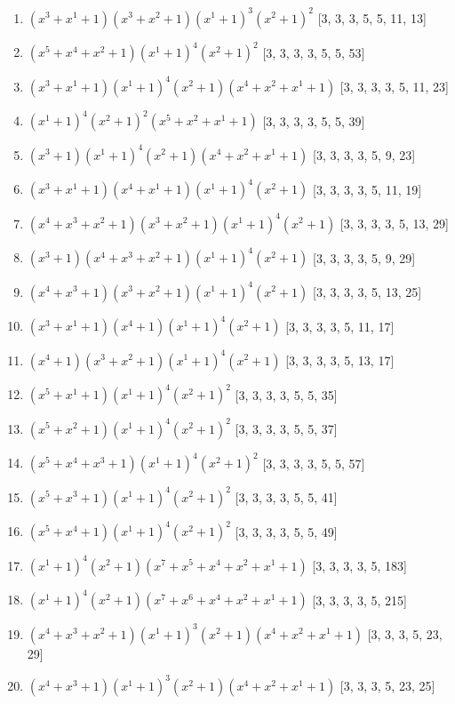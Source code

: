 \documentclass[10pt,twocolumn]{article}
\begin{document}
\begin{enumerate}
\item $(x^{3} + x^{1} + 1)(x^{3} + x^{2} + 1)(x^{1} + 1)^{3}(x^{2} + 1)^{2}$  [3, 3, 3, 5, 5, 11, 13]
\item $(x^{5} + x^{4} + x^{2} + 1)(x^{1} + 1)^{4}(x^{2} + 1)^{2}$  [3, 3, 3, 3, 5, 5, 53]
\item $(x^{3} + x^{1} + 1)(x^{1} + 1)^{4}(x^{2} + 1)(x^{4} + x^{2} + x^{1} + 1)$  [3, 3, 3, 3, 5, 11, 23]
\item $(x^{1} + 1)^{4}(x^{2} + 1)^{2}(x^{5} + x^{2} + x^{1} + 1)$  [3, 3, 3, 3, 5, 5, 39]
\item $(x^{3} + 1)(x^{1} + 1)^{4}(x^{2} + 1)(x^{4} + x^{2} + x^{1} + 1)$  [3, 3, 3, 3, 5, 9, 23]
\item $(x^{3} + x^{1} + 1)(x^{4} + x^{1} + 1)(x^{1} + 1)^{4}(x^{2} + 1)$  [3, 3, 3, 3, 5, 11, 19]
\item $(x^{4} + x^{3} + x^{2} + 1)(x^{3} + x^{2} + 1)(x^{1} + 1)^{4}(x^{2} + 1)$  [3, 3, 3, 3, 5, 13, 29]
\item $(x^{3} + 1)(x^{4} + x^{3} + x^{2} + 1)(x^{1} + 1)^{4}(x^{2} + 1)$  [3, 3, 3, 3, 5, 9, 29]
\item $(x^{4} + x^{3} + 1)(x^{3} + x^{2} + 1)(x^{1} + 1)^{4}(x^{2} + 1)$  [3, 3, 3, 3, 5, 13, 25]
\item $(x^{3} + x^{1} + 1)(x^{4} + 1)(x^{1} + 1)^{4}(x^{2} + 1)$  [3, 3, 3, 3, 5, 11, 17]
\item $(x^{4} + 1)(x^{3} + x^{2} + 1)(x^{1} + 1)^{4}(x^{2} + 1)$  [3, 3, 3, 3, 5, 13, 17]
\item $(x^{5} + x^{1} + 1)(x^{1} + 1)^{4}(x^{2} + 1)^{2}$  [3, 3, 3, 3, 5, 5, 35]
\item $(x^{5} + x^{2} + 1)(x^{1} + 1)^{4}(x^{2} + 1)^{2}$  [3, 3, 3, 3, 5, 5, 37]
\item $(x^{5} + x^{4} + x^{3} + 1)(x^{1} + 1)^{4}(x^{2} + 1)^{2}$  [3, 3, 3, 3, 5, 5, 57]
\item $(x^{5} + x^{3} + 1)(x^{1} + 1)^{4}(x^{2} + 1)^{2}$  [3, 3, 3, 3, 5, 5, 41]
\item $(x^{5} + x^{4} + 1)(x^{1} + 1)^{4}(x^{2} + 1)^{2}$  [3, 3, 3, 3, 5, 5, 49]
\item $(x^{1} + 1)^{4}(x^{2} + 1)(x^{7} + x^{5} + x^{4} + x^{2} + x^{1} + 1)$  [3, 3, 3, 3, 5, 183]
\item $(x^{1} + 1)^{4}(x^{2} + 1)(x^{7} + x^{6} + x^{4} + x^{2} + x^{1} + 1)$  [3, 3, 3, 3, 5, 215]
\item $(x^{4} + x^{3} + x^{2} + 1)(x^{1} + 1)^{3}(x^{2} + 1)(x^{4} + x^{2} + x^{1} + 1)$  [3, 3, 3, 5, 23, 29]
\item $(x^{4} + x^{3} + 1)(x^{1} + 1)^{3}(x^{2} + 1)(x^{4} + x^{2} + x^{1} + 1)$  [3, 3, 3, 5, 23, 25]

\end{enumerate}
\end{document}
